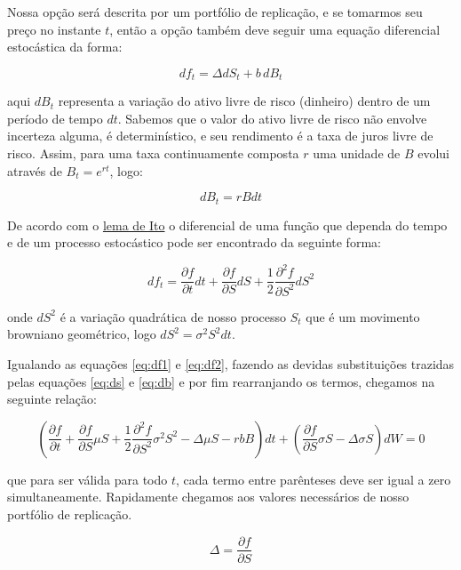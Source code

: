 \documentclass[]{book}
\theoremstyle{definition}
\theoremstyle{definition}
\theoremstyle{definition}
\theoremstyle{remark}
\begin{document}
Nossa opção será descrita por um portfólio de replicação, e se tomarmos seu preço no instante \(t\), então a opção também deve seguir uma equação diferencial estocástica da forma:

\begin{equation}
df_t=\Delta dS_t+b\,dB_t 
\label{eq:df1}
\end{equation}

aqui \(dB_t\) representa a variação do ativo livre de risco (dinheiro) dentro de um período de tempo \(dt\). Sabemos que o valor do ativo livre de risco não envolve incerteza alguma, é determinístico, e seu rendimento é a taxa de juros livre de risco. Assim, para uma taxa continuamente composta \(r\) uma unidade de \(B\) evolui através de \(B_t=e^{rt}\), logo:

\begin{equation}
dB_t=rBdt
\label{eq:db}
\end{equation}

De acordo com o \href{https://pt.wikipedia.org/wiki/Lema_de_It\%C5\%8D}{lema de Ito} o diferencial de uma função que dependa do tempo e de um processo estocástico pode ser encontrado da seguinte forma:

\begin{equation}
df_t=\frac{\partial f}{\partial t}dt + \frac{\partial f}{\partial S}dS + \frac{1}{2}\frac{\partial^2 f}{\partial S^2}dS^2
\label{eq:df2}
\end{equation}

onde \(dS^2\) é a variação quadrática de nosso processo \(S_t\) que é um movimento browniano geométrico, logo \(dS^2=\sigma^2S^2dt\).

Igualando as equações \eqref{eq:df1} e \eqref{eq:df2}, fazendo as devidas substituições trazidas pelas equações \eqref{eq:ds} e \eqref{eq:db} e por fim rearranjando os termos, chegamos na seguinte relação:

\begin{equation}
\left( \frac{\partial f}{\partial t} + \frac{\partial f}{\partial S}\mu S + \frac{1}{2}\frac{\partial^2 f}{\partial S^2}\sigma^2 S^2 - \Delta\mu S - rbB \right)dt + \left( \frac{\partial f}{\partial S}\sigma S - \Delta \sigma S \right)dW = 0 
\end{equation}

que para ser válida para todo \(t\), cada termo entre parênteses deve ser igual a zero simultaneamente. Rapidamente chegamos aos valores necessários de nosso portfólio de replicação.

\begin{equation}
\Delta = \frac{\partial f}{\partial S} 
\label{eq:delta}
\end{equation}
\end{document}
